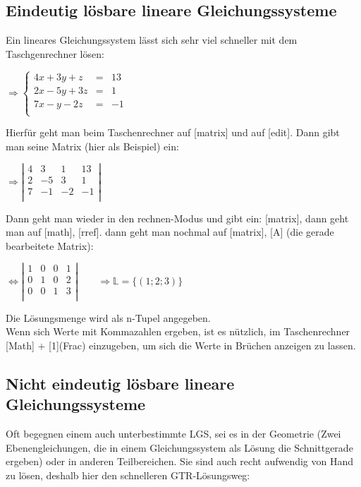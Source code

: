 \documentclass[main.tex]{subfiles}
\begin{document}
\subsection{Eindeutig lösbare lineare Gleichungssysteme}

Ein lineares Gleichungssystem lässt sich sehr viel schneller mit dem Taschgenrechner lösen:

$\Rightarrow \left\{ \begin{array}{rcl}
    4x+3y+z&=&13\\
    2x-5y+3z& =& 1\\
    7x-y-2z&=&-1\\
\end{array}\right.$

Hierfür geht man beim Taschenrechner auf [matrix] und auf [edit]. Dann gibt man seine Matrix (hier als Beispiel) ein:

$\Rightarrow \left\vert \begin{array}{rccl}
    4&3&1&13\\
    2&-5&3& 1 \\
    7&-1&-2&-1\\
\end{array}\right\vert$

Dann geht man wieder in den rechnen-Modus und gibt ein:  [matrix], dann geht man auf [math], [rref]. dann geht man nochmal auf [matrix], [A] (die gerade bearbeitete Matrix):

$\Leftrightarrow \left\vert \begin{array}{rccl}
    1&0&0&1\\
    0&1&0&2 \\
    0&0&1&3\\
\end{array} \right \vert \qquad \Rightarrow \mathbb{L}=\{(1;2;3) \}$

Die Lösungsmenge wird als n-Tupel angegeben.\\
Wenn sich Werte mit Kommazahlen ergeben, ist es nützlich, im Taschenrechner [Math] $+$ [1](Frac) einzugeben, um sich die Werte in Brüchen anzeigen zu lassen.\\


\subsection{Nicht eindeutig lösbare lineare Gleichungssysteme}

Oft begegnen einem auch unterbestimmte LGS, sei es in der Geometrie (Zwei Ebenengleichungen, die in einem Gleichungssystem als Lösung die Schnittgerade ergeben) oder in anderen Teilbereichen. Sie sind auch recht aufwendig von Hand zu lösen, deshalb hier den schnelleren GTR-Lösungsweg:\\
\end{document}
